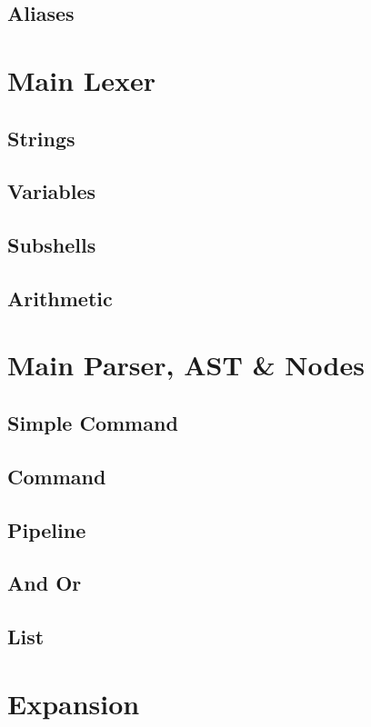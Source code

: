 \subsection{Aliases}

\section{Main Lexer}

\subsection{Strings}
\subsection{Variables}
\subsection{Subshells}
\subsection{Arithmetic}

\section{Main Parser, AST \& Nodes}

\subsection{Simple Command}
\subsection{Command}
\subsection{Pipeline}
\subsection{And Or}
\subsection{List}

\section{Expansion}

